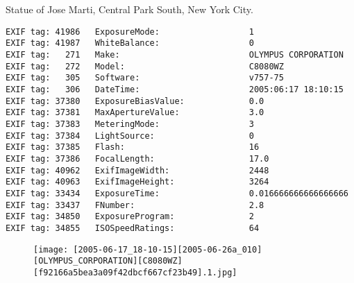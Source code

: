 \section{\protect{}}
\noindent Statue of Jose Marti, Central Park South, New York City.
\noindent
\begin{lstlisting}
EXIF tag: 41986   ExposureMode:                  1
EXIF tag: 41987   WhiteBalance:                  0
EXIF tag:   271   Make:                          OLYMPUS CORPORATION
EXIF tag:   272   Model:                         C8080WZ
EXIF tag:   305   Software:                      v757-75
EXIF tag:   306   DateTime:                      2005:06:17 18:10:15
EXIF tag: 37380   ExposureBiasValue:             0.0
EXIF tag: 37381   MaxApertureValue:              3.0
EXIF tag: 37383   MeteringMode:                  3
EXIF tag: 37384   LightSource:                   0
EXIF tag: 37385   Flash:                         16
EXIF tag: 37386   FocalLength:                   17.0
EXIF tag: 40962   ExifImageWidth:                2448
EXIF tag: 40963   ExifImageHeight:               3264
EXIF tag: 33434   ExposureTime:                  0.016666666666666666
EXIF tag: 33437   FNumber:                       2.8
EXIF tag: 34850   ExposureProgram:               2
EXIF tag: 34855   ISOSpeedRatings:               64

\end{lstlisting}
\clearpage
\begin{figure}
\raggedleft
\texttt{[image: [2005-06-17\_18-10-15][2005-06-26a\_010][OLYMPUS\_CORPORATION][C8080WZ][f92166a5bea3a09f42dbcf667cf23b49].1.jpg]}
\end{figure}


\clearpage
